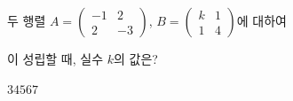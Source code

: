 \hspace*{2mm}\begin{minipage}[t]{\dimexpr\linewidth-2mm\relax}\vspace{0pt}
두 행렬 $A=\begin{pmatrix} -1 & 2 \\ 2 & -3 \end{pmatrix}$, $B=\begin{pmatrix} k & 1 \\ 1 & 4 \end{pmatrix}$에 대하여 \par\smallskip{}\par\smallskip\noindent 이 성립할 때, 실수 $k$의 값은?
\begin{choices32}{$3$}{$4$}{$5$}{$6$}{$7$}\end{choices32}\end{minipage}
